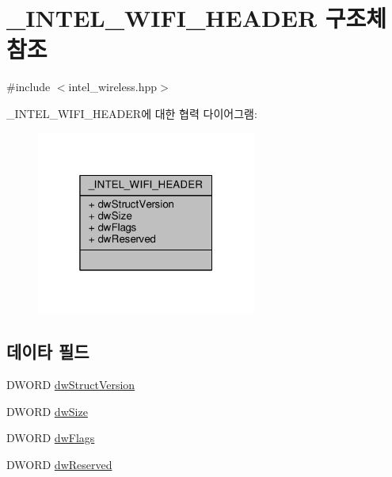 \hypertarget{struct___i_n_t_e_l___w_i_f_i___h_e_a_d_e_r}{}\section{\+\_\+\+I\+N\+T\+E\+L\+\_\+\+W\+I\+F\+I\+\_\+\+H\+E\+A\+D\+ER 구조체 참조}
\label{struct___i_n_t_e_l___w_i_f_i___h_e_a_d_e_r}


{\ttfamily \#include $<$intel\+\_\+wireless.\+hpp$>$}



\+\_\+\+I\+N\+T\+E\+L\+\_\+\+W\+I\+F\+I\+\_\+\+H\+E\+A\+D\+E\+R에 대한 협력 다이어그램\+:
\nopagebreak
\begin{figure}[H]
\begin{center}
\leavevmode
\includegraphics[width=205pt]{struct___i_n_t_e_l___w_i_f_i___h_e_a_d_e_r__coll__graph}
\end{center}
\end{figure}
\subsection*{데이타 필드}
\begin{DoxyCompactItemize}
\item 
D\+W\+O\+RD \hyperlink{struct___i_n_t_e_l___w_i_f_i___h_e_a_d_e_r_a1955a5d9a8f0620b32d679505ea5b0ae}{dw\+Struct\+Version}
\item 
D\+W\+O\+RD \hyperlink{struct___i_n_t_e_l___w_i_f_i___h_e_a_d_e_r_a669c5a85f5a9eb97e64ad880fadaaa2d}{dw\+Size}
\item 
D\+W\+O\+RD \hyperlink{struct___i_n_t_e_l___w_i_f_i___h_e_a_d_e_r_a4d2f405b1141000eb2af256e0fc8b98b}{dw\+Flags}
\item 
D\+W\+O\+RD \hyperlink{struct___i_n_t_e_l___w_i_f_i___h_e_a_d_e_r_aff43e39fdc639a5bdbb6f9874317c5a4}{dw\+Reserved}
\end{DoxyCompactItemize}


